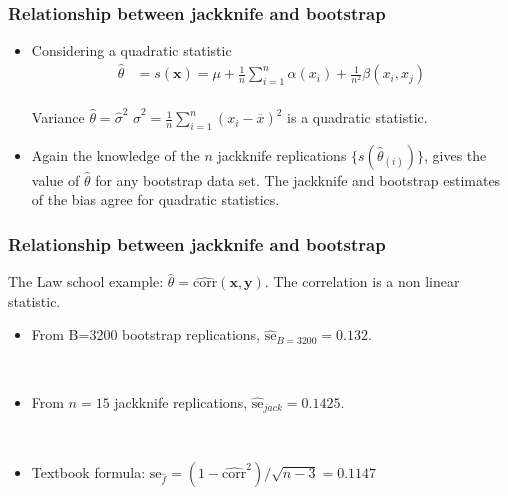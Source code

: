 \frame
{
\frametitle{Relationship between jackknife and bootstrap}


\begin{itemize}
\item Considering a quadratic  statistic
$$
\begin{array}{ll}
\hat{\theta}&=s(\mathbf{x})=\mu+\frac{1}{n} \sum_{i=1}^{n}\alpha(x_i)+\frac{1}{n^2} \beta(x_i,x_j)\\
\end{array}
$$
\begin{exampleblock}{Variance $\hat{\theta}=\hat{\sigma}^{2}$}
$\hat{\sigma}^{2}=\frac{1}{n}\sum_{i=1}^{n}(x_i-\overline{x})^2$ is a quadratic statistic.
\end{exampleblock}

\item Again the knowledge of the $n$ jackknife replications $\lbrace s(\hat{\theta}_{(i)}) \rbrace$, gives the value of $\hat{\theta}$ for any bootstrap data set. The jackknife and bootstrap estimates of the bias agree for quadratic statistics. 
\end{itemize}

}
\frame
{
\frametitle{Relationship between jackknife and bootstrap}
\begin{exampleblock}{The Law school example: $\hat{\theta}=\widehat{\mathrm{corr}}(\mathbf{x},\mathbf{y})$.}
The correlation is a non linear statistic.
\begin{itemize}
\item From B=3200 bootstrap replications, $\hat{\mathrm{se}}_{B=3200}=0.132$. 

\

\item From $n=15$ jackknife replications, $\hat{\mathrm{se}}_{jack}= 0.1425$.

\

\item Textbook formula: 
$\mathrm{se}_{\hat{f}}=(1-\widehat{\mathrm{corr}}^2)/\sqrt{n-3}=0.1147$
\end{itemize}
\end{exampleblock}

}

